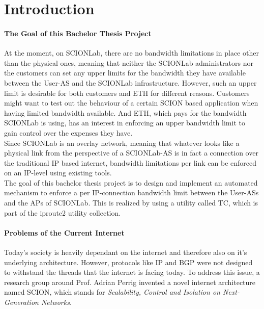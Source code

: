 \chapter{Introduction}

\subsubsection{The Goal of this Bachelor Thesis Project}

At the moment, on \acs{SCIONLab}, there are no bandwidth limitations in place other than the physical ones, meaning that neither the \acs{SCIONLab} administrators nor the customers can set any upper limits for the bandwidth they have available between the User-\acs{AS} and the \acs{SCIONLab} infrastructure. However, such an upper limit is desirable for both customers and \acs{ETH} for different reasons. Customers might want to test out the behaviour of a certain \acs{SCION} based application when having limited bandwidth available. And \acs{ETH}, which pays for the bandwidth \acs{SCIONLab} is using, has an interest in enforcing an upper bandwidth limit to gain control over the expenses they have.
\\
Since \acs{SCIONLab} is an overlay network, meaning that whatever looks like a physical link from the perspective of a \acs{SCIONLab}-\acs{AS} is in fact a connection over the traditional \acs{IP} based internet, bandwidth limitations per link can be enforced on an \acs{IP}-level using existing tools.
\\
The goal of this bachelor thesis project is to design and implement an automated mechanism to enforce a per \acs{IP}-connection bandwidth limit between the User-\acsp{AS} and the \aclp{AP} of \acs{SCIONLab}. This is realized by using a utility called \ac{TC}, which is part of the iproute2 utility collection.

\subsubsection{Problems of the Current Internet}

Today's society is heavily dependant on the internet and therefore also on it's underlying architecture. However, protocols like \ac{IP} and \ac{BGP} were not designed to withstand the threads that the internet is facing today. To address this issue, a research group around Prof. Adrian Perrig invented a novel internet architecture named \ac{SCION}, which stands for \textit{Scalability, Control and Isolation on Next-Generation Networks}.

